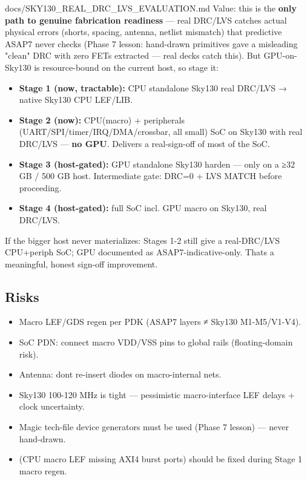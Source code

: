 \begin{relocated}{docs/SKY130_REAL_DRC_LVS_EVALUATION.md}
Value: this is the \textbf{only path to genuine fabrication readiness}
--- real DRC/LVS catches actual physical errors (shorts, spacing,
antenna, netlist mismatch) that predictive ASAP7 never checks (Phase 7
lesson: hand-drawn primitives gave a misleading "clean" DRC with zero
FETs extracted --- real decks catch this). But GPU-on-Sky130 is
resource-bound on the current host, so stage it:

\begin{itemize}
\tightlist
\item
  \textbf{Stage 1 (now, tractable):} CPU standalone Sky130 real DRC/LVS
  → native Sky130 CPU LEF/LIB.
\item
  \textbf{Stage 2 (now):} CPU(macro) + peripherals
  (UART/\allowbreak{}SPI/\allowbreak{}timer/\allowbreak{}IRQ/\allowbreak{}DMA/\allowbreak{}crossbar,
  all small) SoC on Sky130 with real DRC/LVS --- \textbf{no GPU}.
  Delivers a real-sign-off of most of the SoC.
\item
  \textbf{Stage 3 (host-gated):} GPU standalone Sky130 harden --- only
  on a ≥32 GB / 500 GB host. Intermediate gate: DRC=0 + LVS MATCH before
  proceeding.
\item
  \textbf{Stage 4 (host-gated):} full SoC incl. GPU macro on Sky130,
  real DRC/LVS.
\end{itemize}

If the bigger host never materializes: Stages 1-2 still give a
real-DRC/\allowbreak{}LVS CPU+periph SoC; GPU documented as
ASAP7-indicative-only. That\textquotesingle s a meaningful, honest
sign-off improvement.

\subsection{Risks}\label{tm:pd:sky130-real-drc-lvs:3-risks}

\begin{itemize}
\tightlist
\item
  Macro LEF/GDS regen per PDK (ASAP7 layers ≠ Sky130
  M1-M5/\allowbreak{}V1-V4).
\item
  SoC PDN: connect macro VDD/VSS pins to global rails (floating-domain
  risk).
\item
  Antenna: don\textquotesingle t re-insert diodes on macro-internal
  nets.
\item
  Sky130 100-120 MHz is tight --- pessimistic macro-interface LEF delays
  + clock uncertainty.
\item
  Magic tech-file device generators must be used (Phase 7 lesson) ---
  never hand-drawn.
\item
   (CPU macro LEF missing AXI4 burst ports) should be fixed
  during Stage 1 macro regen.
\end{itemize}


\end{relocated}
